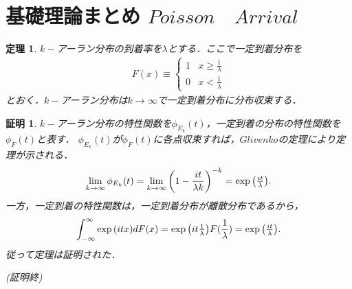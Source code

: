 \documentclass[a4j,papersize,disablejfam,slide,14pt]{jsarticle}
\newtheorem{Prop}{定理}
\newtheorem{Proof}{証明}
\def\qed{{\begin{flushright} (証明終) \end{flushright}}} %
\def\exp#1{\mbox{${\rm exp} \left( #1 \right)$}} %
\begin{document}
\section{基礎理論まとめ \qquad $Poisson\quad Arrival$}
	\begin{screen}
    	\begin{Prop}
        	$k-$アーラン分布の到着率を$\lambda$とする．ここで一定到着分布を
            \begin{eqnarray}
            	F(x) \equiv
                \begin{cases}
                	1 & \text{$x \geq \frac{1}{\lambda}$}\\
                    0 & \text{$x < \frac{1}{\lambda}$}
                \end{cases}
            \end{eqnarray}
            とおく．$k-$アーラン分布は$k \rightarrow \infty$で一定到着分布に分布収束する．
        \end{Prop}
    \end{screen}
    \begin{Proof}
    	$k-$アーラン分布の特性関数を$\phi_{E_k}(t)$，一定到着の分布の特性関数を$\phi_{F}(t)$と表す．
        $\phi_{E_k}(t)$が$\phi_{F}(t)$に各点収束すれば，$Glivenko$の定理により定理が示される．
        \begin{eqnarray}
        	\lim_{k \to \infty} \phi_{E_k}(t) = \lim_{k \to \infty} \left( 1 - \frac{it}{\lambda k} \right)^{-k} 
            = \exp{\frac{it}{\lambda}}.
        \end{eqnarray}
        一方，一定到着の特性関数は，一定到着分布が離散分布であるから，
        \begin{eqnarray}
        	\int_{-\infty}^{\infty} \exp{itx} dF(x) = \exp{it\frac{1}{\lambda}} F(\frac{1}{\lambda}) = \exp{\frac{it}{\lambda}}.
        \end{eqnarray}
        従って定理は証明された．\qed
    \end{Proof}

\newpage
\end{document}
